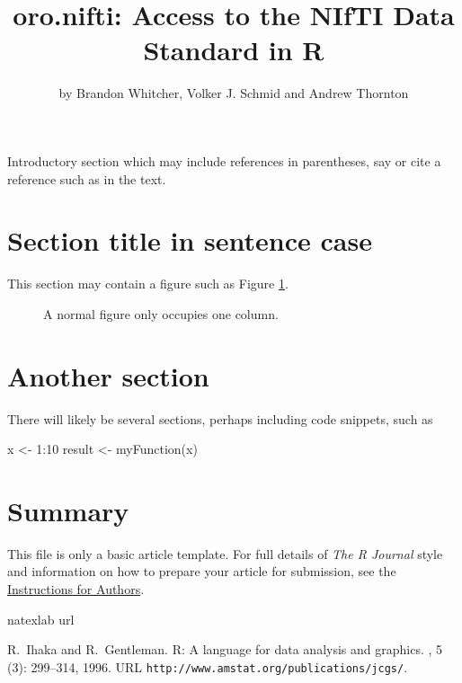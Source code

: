 \title{oro.nifti: Access to the NIfTI Data Standard in R}
\author{by Brandon Whitcher, Volker J. Schmid and Andrew Thornton}

\maketitle


Introductory section which may include references in parentheses, say
\citep{R:Ihaka+Gentleman:1996} or cite a reference such as
\citet{R:Ihaka+Gentleman:1996} in the text.

\section{Section title in sentence case}

This section may contain a figure such as Figure \ref{figure:onecolfig}.

\begin{figure}
\vspace*{.1in}
\caption{\label{figure:onecolfig}
A normal figure only occupies one column.}
\end{figure}

\section{Another section}

There will likely be several sections, perhaps including code snippets, such
as
\begin{example}
  x <- 1:10
  result <- myFunction(x)
\end{example}

\section{Summary}

This file is only a basic article template. For full details of \emph{The R Journal}
style and information on how to prepare your article for submission, see the
\href{http://journal.r-project.org/latex/RJauthorguide.pdf}{Instructions for Authors}.

%

\begin{thebibliography}{1}
\expandafter\ifx\csname natexlab\endcsname\relax\def\natexlab#1{#1}\fi
\expandafter\ifx\csname url\endcsname\relax
  \def\url#1{{\tt #1}}\fi

R.~Ihaka and R.~Gentleman.
\newblock R: A language for data analysis and graphics.
, 5
  (3): 299--314, 1996.
\newblock URL \url{http://www.amstat.org/publications/jcgs/}.

\end{thebibliography}

